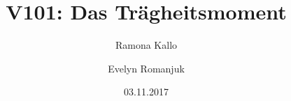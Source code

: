 


\title{V101: Das Trägheitsmoment}
\author{Ramona Kallo \and Evelyn Romanjuk}
\date{03.11.2017}
\maketitle 
\newpage
\tableofcontents
\newpage




\nocite{*}
\printbibliography


